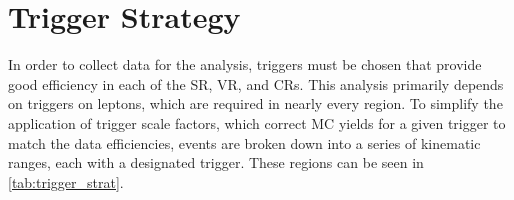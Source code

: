 \section{Trigger Strategy}
\label{sec:trig_strategy}

In order to collect data for the analysis, triggers must be chosen that provide good efficiency in each of the \ac{SR}, \ac{VR}, and \acp{CR}. This analysis primarily depends on triggers on leptons, which are required in nearly every region. To simplify the application of trigger scale factors, which correct \ac{MC} yields for a given trigger to match the data efficiencies, events are broken down into a series of kinematic ranges, each with a designated trigger. These regions can be seen in \autoref{tab:trigger_strat}.

\begin{table}[hbt]
\begin{center}
\end{center}
\end{table}
